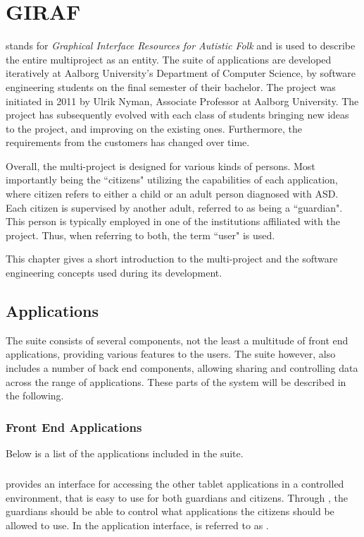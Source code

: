 \chapter{GIRAF}\label{chap:giraf}
\giraf  stands for \textit{Graphical Interface Resources for Autistic Folk} and is used to describe the entire multiproject as an entity.
The suite of \giraf applications are developed iteratively at Aalborg University's Department of Computer Science, by software engineering students on the final semester of their bachelor.
The project was initiated in 2011 by Ulrik Nyman, Associate Professor at Aalborg University.
The project has subsequently evolved with each class of students bringing new ideas to the project, and improving on the existing ones.
Furthermore, the requirements from the customers has changed over time.

Overall, the multi-project is designed for various kinds of persons.
Most importantly being the ``citizens" utilizing the capabilities of each application, where citizen refers to either a child or an adult person diagnosed with ASD.
Each citizen is supervised by another adult, referred to as being a ``guardian".
This person is typically employed in one of the institutions affiliated with the \giraf project.
Thus, when referring to both, the term ``user" is used.

This chapter gives a short introduction to the \giraf multi-project and the software engineering concepts used during its development.

\section{\giraf Applications}\label{sec:giraf:applications}
The \giraf suite consists of several components, not the least a multitude of front end applications, providing various features to the users. 
The suite however, also includes a number of back end components, allowing sharing and controlling data across the range of applications. 
These parts of the system will be described in the following.

\subsection{Front End Applications}
\label{sec:giraf:applications:frontend}
Below is a list of the applications included in the \giraf suite.

\paragraph{\launcher}
provides an interface for accessing the other tablet applications in a controlled environment, that is easy to use for both guardians and citizens. 
Through \launcher, the guardians should be able to control what applications the citizens should be allowed to use. In the application interface, \launcher is referred to as \giraf.

